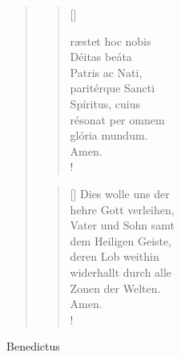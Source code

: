 \begin{quote}
\begin{multicols}{2}
\begin{verse}[\versewidth]

{\normalsize{ræstet hoc nobis\\
Déitas beáta\\
Patris ac Nati,\\
paritérque Sancti\\
Spíritus, cuius\\
résonat per omnem\\
glória mundum.\\
Amen.\\!}}
\end{verse}

\columnbreak

\begin{verse}[\versewidth]
{\normalsize\rm{ Dies wolle uns der\\ 
hehre Gott verleihen,\\
Vater und Sohn samt\\
dem Heiligen Geiste,\\
deren Lob weithin\\
widerhallt durch alle\\ 
Zonen der Welten.\\
Amen.\\!}}

\end{verse}
\end{multicols}

\end{quote}



\medskip

\begin{flushleft}


\medskip
{\rm{
}}
\end{flushleft}

\vspace{0.3cm}

\def\greinitialformat#1{{\fontsize{40}{40}\selectfont #1}}
\gresetfirstlineaboveinitial{\footnotesize \textcolor{red}{Bendic}}{}
\setaboveinitialseparation{0.72mm}


\smallskip

 Benedictus 
